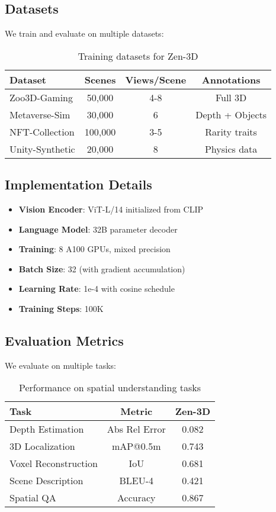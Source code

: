 \documentclass[11pt,a4paper]{article}
\begin{document}
\subsection{Datasets}

We train and evaluate on multiple datasets:

\begin{table}[h]
\centering
\begin{tabular}{lccc}
\toprule
Dataset & Scenes & Views/Scene & Annotations \\
\midrule
Zoo3D-Gaming & 50,000 & 4-8 & Full 3D \\
Metaverse-Sim & 30,000 & 6 & Depth + Objects \\
NFT-Collection & 100,000 & 3-5 & Rarity traits \\
Unity-Synthetic & 20,000 & 8 & Physics data \\
\bottomrule
\end{tabular}
\caption{Training datasets for Zen-3D}
\end{table}

\subsection{Implementation Details}

\begin{itemize}
\item \textbf{Vision Encoder}: ViT-L/14 initialized from CLIP
\item \textbf{Language Model}: 32B parameter decoder
\item \textbf{Training}: 8 A100 GPUs, mixed precision
\item \textbf{Batch Size}: 32 (with gradient accumulation)
\item \textbf{Learning Rate}: 1e-4 with cosine schedule
\item \textbf{Training Steps}: 100K
\end{itemize}

\subsection{Evaluation Metrics}

We evaluate on multiple tasks:

\begin{table}[h]
\centering
\begin{tabular}{lcc}
\toprule
Task & Metric & Zen-3D \\
\midrule
Depth Estimation & Abs Rel Error & 0.082 \\
3D Localization & mAP@0.5m & 0.743 \\
Voxel Reconstruction & IoU & 0.681 \\
Scene Description & BLEU-4 & 0.421 \\
Spatial QA & Accuracy & 0.867 \\
\bottomrule
\end{tabular}
\caption{Performance on spatial understanding tasks}
\end{table}
\end{document}
